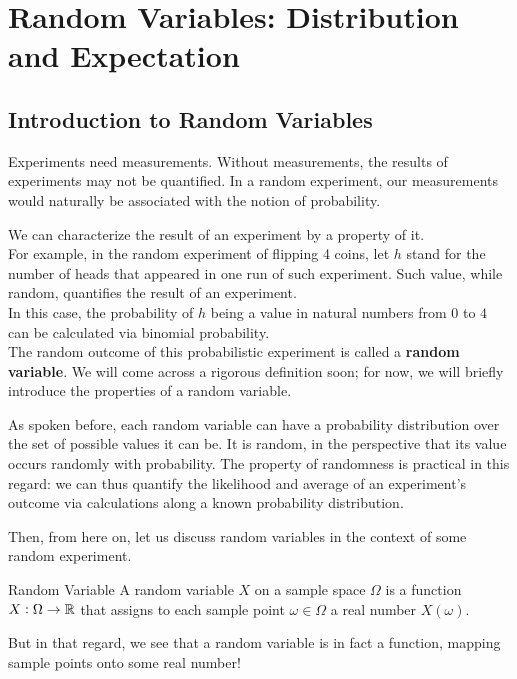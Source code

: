 \chapter{Random Variables: Distribution and Expectation}

\section{Introduction to Random Variables}
Experiments need measurements. Without measurements, the results of experiments may not be quantified. In a random experiment, our measurements would naturally be associated with the notion of probability.

We can characterize the result of an experiment by a property of it. \\
For example, in the random experiment of flipping 4 coins, let $h$ stand for the number of heads that appeared in one run of such experiment. Such value, while random, quantifies the result of an experiment. \\
In this case, the probability of $h$ being a value in natural numbers from $0$ to $4$ can be calculated via binomial probability. \\
The random outcome of this probabilistic experiment is called a \textbf{random variable}. We will come across a rigorous definition soon; for now, we will briefly introduce the properties of a random variable.

As spoken before, each random variable can have a probability distribution over the set of possible values it can be. It is random, in the perspective that its value occurs randomly with probability. The property of randomness is practical in this regard: we can thus quantify the likelihood and average of an experiment's outcome via calculations along a known probability distribution.

Then, from here on, let us discuss random variables in the context of some random experiment.
\begin{ln-define}{Random Variable}{}
    A random variable $X$ on a sample space $\Omega$ is a function $X:\Omega \rightarrow \mathbb{R}$ that assigns to each sample point $\omega \in \Omega$ a real number $X(\omega)$.
\end{ln-define}
But in that regard, we see that a random variable is in fact a function, mapping sample points onto some real number!

